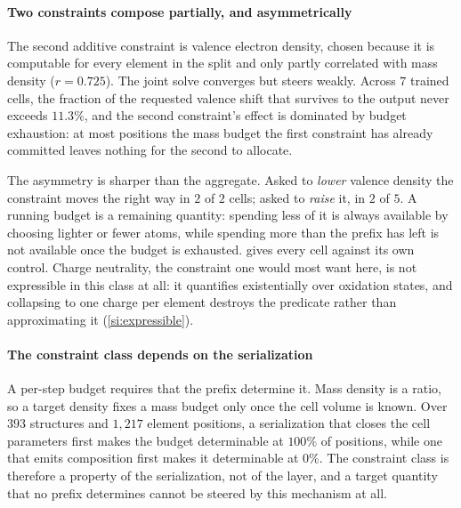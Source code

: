 \paragraph{Two constraints compose partially, and asymmetrically}
The second additive constraint is valence electron density, chosen because it is
computable for every element in the split and only partly correlated with mass density
($r = 0.725$). The joint solve converges but steers weakly. Across
$7$ trained cells, the fraction of the requested valence shift that survives to the
output never exceeds $11.3\%$, and the second constraint's effect is dominated by
budget exhaustion: at most positions the mass budget the first constraint has already
committed leaves nothing for the second to allocate.

The asymmetry is sharper than the aggregate. Asked to \emph{lower} valence density the
constraint moves the right way in $2$ of $2$ cells; asked to \emph{raise} it, in $2$ of
$5$. A running budget is a remaining quantity: spending less of it is always available by
choosing lighter or fewer atoms, while spending more than the prefix has left is not
available once the budget is exhausted.  gives every cell against
its own control. Charge neutrality, the constraint one would most want here, is not
expressible in this class at all: it quantifies existentially over oxidation states,
and collapsing to one charge per element destroys the predicate rather than approximating
it (\cref{si:expressible}).

\paragraph{The constraint class depends on the serialization}
A per-step budget requires that the prefix determine it. Mass density is a ratio, so a
target density fixes a mass budget only once the cell volume is known. Over $393$
structures and $1{,}217$ element positions, a serialization that closes the cell
parameters first makes the budget determinable at $100\%$ of positions, while one that
emits composition first makes it determinable at $0\%$. The constraint class is
therefore a property of the serialization, not of the layer, and a target quantity that
no prefix determines cannot be steered by this mechanism at all.

